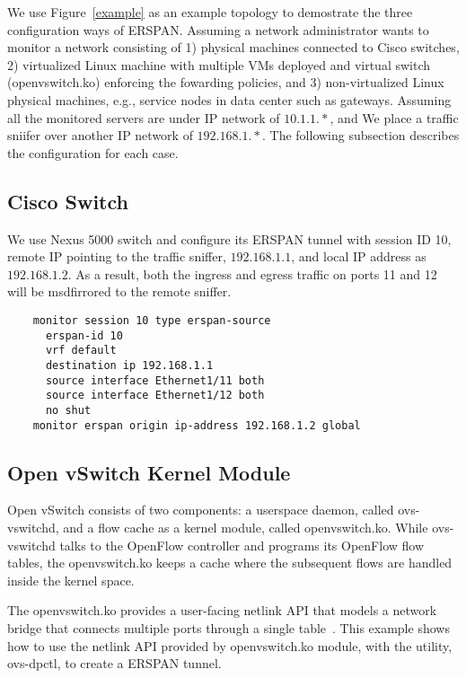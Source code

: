 \documentclass[10pt]{sigplanconf}
\begin{document}
We use Figure~\ref{example} as an example topology to demostrate
the three configuration ways of ERSPAN.
Assuming a network administrator wants to monitor a network consisting
of 1) physical machines connected to Cisco switches, 2)
virtualized Linux machine with multiple VMs deployed and virtual switch
(openvswitch.ko) enforcing the fowarding policies, and
3) non-virtualized Linux physical machines, e.g., service nodes
in data center such as gateways.
Assuming all the monitored servers are under IP network of $10.1.1.*$,
and We place a traffic sniifer over another IP network of $192.168.1.*$.
The following subsection describes the configuration for each case.

\subsection{Cisco Switch}
We use Nexus 5000 switch and configure its ERSPAN tunnel
with session ID 10, remote IP pointing to the traffic sniffer, $192.168.1.1$,
and local IP address as $192.168.1.2$.  As a result, both the ingress and
egress traffic on ports 11 and 12 will be msdfirrored to the remote sniffer.
{\footnotesize
\begin{verbatim}
    monitor session 10 type erspan-source
      erspan-id 10
      vrf default
      destination ip 192.168.1.1
      source interface Ethernet1/11 both
      source interface Ethernet1/12 both
      no shut
    monitor erspan origin ip-address 192.168.1.2 global
\end{verbatim}
}

\subsection{Open vSwitch Kernel Module}\label{ovs}
Open vSwitch consists of two components: a userspace daemon, called ovs-vswitchd,
and a flow cache as a kernel module, called openvswitch.ko.  While ovs-vswitchd
talks to the OpenFlow controller and programs its OpenFlow flow tables,
the openvswitch.ko keeps a cache where the subsequent flows are handled
inside the kernel space.

The openvswitch.ko provides a user-facing netlink API that models a network
bridge that connects multiple ports through a single table~\cite{ovswoovs}.
This example shows how to use the netlink API provided by openvswitch.ko
module, with the utility, ovs-dpctl, to create a ERSPAN tunnel.
\end{document}
